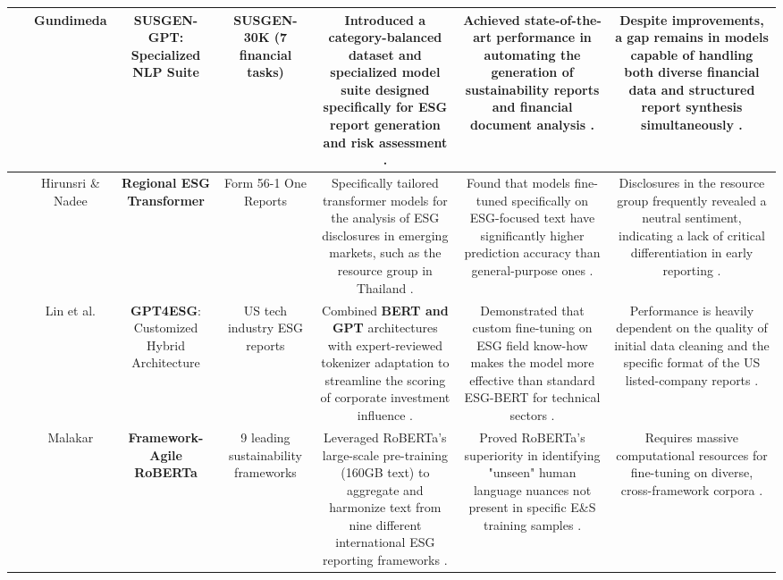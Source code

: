 \documentclass{article}
\begin{document}
\begin{table}[h!]
\begin{tabular}{|c|c|c|c|c|c|c|}
~ & Gundimeda  \parencite{ravi_teja_gundimeda_ec944424} & \textbf{SUSGEN-GPT}: Specialized NLP Suite & SUSGEN-30K (7 financial tasks)  \parencite{ravi_teja_gundimeda_ec944424} & Introduced a category-balanced dataset and specialized model suite designed specifically for ESG report generation and risk assessment  \parencite{ravi_teja_gundimeda_ec944424}. & Achieved state-of-the-art performance in automating the generation of sustainability reports and financial document analysis  \parencite{ravi_teja_gundimeda_ec944424}. & Despite improvements, a gap remains in models capable of handling both diverse financial data and structured report synthesis simultaneously  \parencite{ravi_teja_gundimeda_ec944424}. \\ \hline
~ & Hirunsri \& Nadee  \parencite{tharnsaithong_hirunsri_e4c4d75b} & \textbf{Regional ESG Transformer} & Form 56-1 One Reports  \parencite{tharnsaithong_hirunsri_e4c4d75b} & Specifically tailored transformer models for the analysis of ESG disclosures in emerging markets, such as the resource group in Thailand  \parencite{tharnsaithong_hirunsri_e4c4d75b}. & Found that models fine-tuned specifically on ESG-focused text have significantly higher prediction accuracy than general-purpose ones  \parencite{tharnsaithong_hirunsri_e4c4d75b}. & Disclosures in the resource group frequently revealed a neutral sentiment, indicating a lack of critical differentiation in early reporting  \parencite{tharnsaithong_hirunsri_e4c4d75b}. \\ \hline
~ & Lin et al.  \parencite{lydia_hsiao_mei_lin_d5fe9773} & \textbf{GPT4ESG}: Customized Hybrid Architecture & US tech industry ESG reports  \parencite{lydia_hsiao_mei_lin_d5fe9773} & Combined \textbf{BERT and GPT} architectures with expert-reviewed tokenizer adaptation to streamline the scoring of corporate investment influence  \parencite{lydia_hsiao_mei_lin_d5fe9773}. & Demonstrated that custom fine-tuning on ESG field know-how makes the model more effective than standard ESG-BERT for technical sectors  \parencite{lydia_hsiao_mei_lin_d5fe9773}. & Performance is heavily dependent on the quality of initial data cleaning and the specific format of the US listed-company reports  \parencite{lydia_hsiao_mei_lin_d5fe9773}. \\ \hline
~ & Malakar  \parencite{baridhi_malakar_1e79b25c} & \textbf{Framework-Agile RoBERTa} & 9 leading sustainability frameworks  \parencite{baridhi_malakar_1e79b25c} & Leveraged RoBERTa’s large-scale pre-training (160GB text) to aggregate and harmonize text from nine different international ESG reporting frameworks  \parencite{baridhi_malakar_1e79b25c}. & Proved RoBERTa's superiority in identifying "unseen" human language nuances not present in specific E\&S training samples  \parencite{baridhi_malakar_1e79b25c}. & Requires massive computational resources for fine-tuning on diverse, cross-framework corpora  \parencite{baridhi_malakar_1e79b25c}. \\ \hline

\end{tabular}
\end{table}
\end{document}
